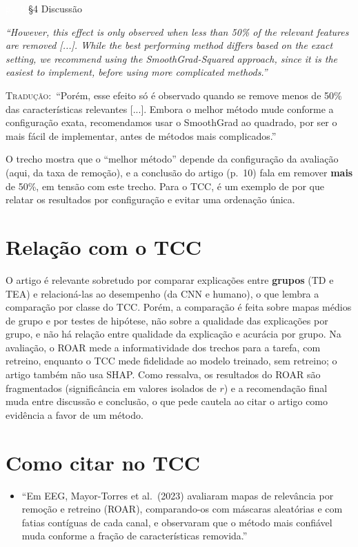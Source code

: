 \documentclass[11pt,a4paper]{article}
\newcommand{\pagechip}[1]{{\setlength{\fboxsep}{1.5pt}\colorbox{cAcc}{\textcolor{white}{\scriptsize\texttt{#1}}}}}
\newenvironment{origquote}{\par\itshape\small}{\par}
\newenvironment{tradquote}{\par\small\textsc{Tradução:}\ }{\par}
\newcommand{\explab}[1]{\par\smallskip{\small\color{cAcc}\textbf{\MakeUppercase{#1}}}\par}
\begin{document}
\begin{citacard}{\pagechip{p. 9} §4 Discussão}
\begin{origquote}“However, this effect is only observed when less than 50\% of the relevant features are removed [...]. While the best performing method differs based on the exact setting, we recommend using the SmoothGrad-Squared approach, since it is the easiest to implement, before using more complicated methods.”\end{origquote}
\begin{tradquote}“Porém, esse efeito só é observado quando se remove menos de 50\% das características relevantes [...]. Embora o melhor método mude conforme a configuração exata, recomendamos usar o SmoothGrad ao quadrado, por ser o mais fácil de implementar, antes de métodos mais complicados.”\end{tradquote}
\explab{Explicação}
O trecho mostra que o ``melhor método'' depende da configuração da avaliação (aqui, da taxa de remoção), e a conclusão do artigo (p.~10) fala em remover \textbf{mais} de 50\%, em tensão com este trecho. Para o TCC, é um exemplo de por que relatar os resultados por configuração e evitar uma ordenação única.
\end{citacard}

\section{Relação com o TCC}
O artigo é relevante sobretudo por comparar explicações entre \textbf{grupos} (TD e TEA) e relacioná-las ao desempenho (da CNN e humano), o que lembra a comparação por classe do TCC. Porém, a comparação é feita sobre mapas médios de grupo e por testes de hipótese, não sobre a qualidade das explicações por grupo, e não há relação entre qualidade da explicação e acurácia por grupo. Na avaliação, o ROAR mede a informatividade dos trechos para a tarefa, com retreino, enquanto o TCC mede fidelidade ao modelo treinado, sem retreino; o artigo também não usa SHAP. Como ressalva, os resultados do ROAR são fragmentados (significância em valores isolados de $r$) e a recomendação final muda entre discussão e conclusão, o que pede cautela ao citar o artigo como evidência a favor de um método.

\section{Como citar no TCC}
\begin{itemize}
\item ``Em EEG, Mayor-Torres et al.\ (2023) avaliaram mapas de relevância por remoção e retreino (ROAR), comparando-os com máscaras aleatórias e com fatias contíguas de cada canal, e observaram que o método mais confiável muda conforme a fração de características removida.''
\end{itemize}
\end{document}
